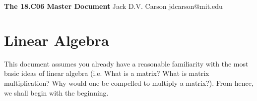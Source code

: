 \documentclass[11pt]{article}
\begin{document}
\thispagestyle{empty}
\bigskip 
\vspace{0.1cm}

\begin{center}
		{\fontsize{20}{20} \selectfont \bf \sffamily The 18.C06 Master Document}
	\vskip 12pt
		{\fontsize{18}{18} \selectfont \rmfamily Jack D.V. Carson}
	\vskip 6pt
		{\fontsize{14}{14} \selectfont \ttfamily jdcarson@mit.edu}
	\vskip 24pt
\end{center}


\microtoc

\section{Linear Algebra}
This document assumes you already have a reasonable familiarity with the most basic ideas of linear algebra (i.e. What is a matrix? What is matrix multiplication? Why would one be compelled to multiply a matrix?). From hence, we shall begin with the beginning.
\end{document}
